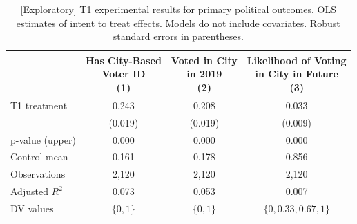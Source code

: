 \documentclass[
  11.5pt,
]{article}
\begin{document}
\begin{table}[!h]

\caption{\label{tab:unnamed-chunk-60}[Exploratory] T1 experimental results for primary political outcomes. OLS estimates of intent to treat effects. Models do not include covariates. Robust standard errors in parentheses.}
\centering
\begin{tabular}[t]{lccc}
\toprule
 & \makecell[c]{Has City-Based\\ Voter ID \\(1)} & \makecell[c]{Voted in City\\ in 2019 \\(2)} & \makecell[c]{Likelihood of Voting\\ in City in Future \\(3)}\\
\midrule
T1 treatment & 0.243 & 0.208 & 0.033\\
 & (0.019) & (0.019) & (0.009)\\
\midrule
p-value (upper) & 0.000 & 0.000 & 0.000\\
Control mean & 0.161 & 0.178 & 0.856\\
Observations & 2,120 & 2,120 & 2,120\\
Adjusted $R^2$ & 0.073 & 0.053 & 0.007\\
DV values & $\{0, 1\}$ & $\{0, 1\}$ & $\{0, 0.33, 0.67, 1\}$\\
\bottomrule
\end{tabular}
\end{table}
\end{document}
